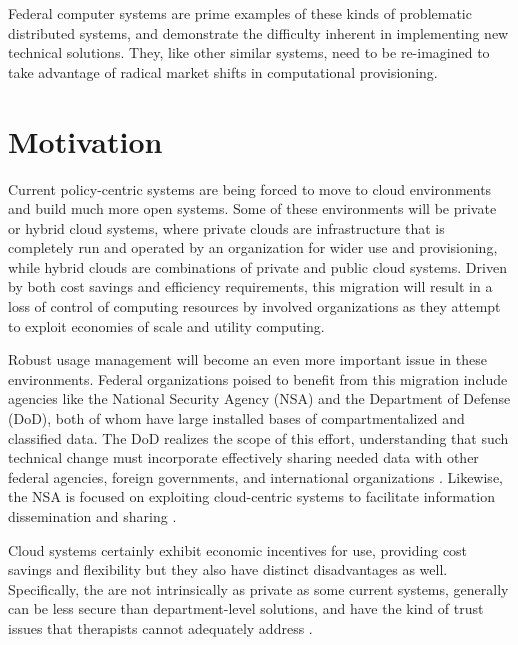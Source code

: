 \documentclass[12pt,letterpaper]{article}
\begin{document}
Federal computer systems are prime examples of these kinds of problematic distributed systems, and demonstrate the difficulty inherent in implementing new technical solutions.  They, like other similar systems, need to be re-imagined to take advantage of radical market shifts in computational provisioning.
\section{Motivation}
Current policy-centric systems are being forced to move to cloud environments and build much more open systems.  Some of these environments will be private or hybrid cloud systems, where private clouds are infrastructure that is completely run and operated by an organization for wider use and provisioning, while hybrid clouds are combinations of private and public cloud systems.  Driven by both cost savings and efficiency requirements, this migration will result in a loss of control of computing resources by involved organizations as they attempt to exploit economies of scale and utility computing.

Robust usage management will become an even more important issue in these environments.  Federal organizations poised to benefit from this migration include agencies like the National Security Agency (NSA) and the Department of Defense (DoD), both of whom have large installed bases of compartmentalized and classified data.  The DoD realizes the scope of this effort, understanding that such technical change must incorporate effectively sharing needed data with other federal agencies, foreign governments, and international organizations \cite{proposal:info-sharing-strategy}.  Likewise, the NSA is focused on exploiting cloud-centric systems to facilitate information dissemination and sharing \cite{proposal:nsa-cloud}.

Cloud systems certainly exhibit economic incentives for use, providing cost savings and flexibility but they also have distinct disadvantages as well.  Specifically, the are not intrinsically as private as some current systems, generally can be less secure than department-level solutions, and have the kind of trust issues that therapists cannot adequately address \cite{proposal:privacy-security-trust-cloud}.
\end{document}
